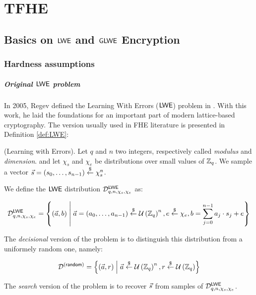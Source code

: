 
\chapter{TFHE}



\section{Basics on $\textsf{LWE}$ and $\textsf{GLWE}$ Encryption}


\subsection{Hardness assumptions}


\paragraph{Original $\textsf{LWE}$ problem}

In 2005, Regev defined the Learning With Errors ($\textsf{LWE}$) problem in \cite{regev_lwe}. With this work, he laid the foundations for an important part of modern lattice-based cryptography. The version usually used in FHE literature is presented in Definition \ref{def:LWE}:


\begin{definition}
	(Learning with Errors). Let $q$ and $n$ two integers, respectively called \textit{modulus} and \textit{dimension}.  and let $\chi_s$ and $\chi_e$ be distributions over small values of $\mathbb{Z}_q$. We sample a vector $\vec s = (s_0, \dots, s_{n-1}) \overset{\$}{\leftarrow} \chi_s^n$. 
	
	We define the $\textsf{LWE}$ distribution $\mathcal{D}_{q, n, \chi_s, \chi_e}^{\textsf{LWE}}$ as:
	
	 \[
	 \mathcal{D}_{q, n, \chi_s, \chi_e}^{\textsf{LWE}} = \left \{(\vec a, b) \;\middle|\; \vec a = (a_0, \dots, a_{n-1}) \overset{\$}{\leftarrow} \mathcal U \left ( \mathbb{Z}_q \right )^n, e \overset{\$}{\leftarrow} \chi_e, b = \sum_{j=0}^{n-1} a_j \cdot s_j + e \right \}
	  \]
	 
	 The \textit{decisional} version of the problem is to distinguish this distribution from a uniformely random one, namely:
	
	\[
	\mathcal{D}^{(\textsf{random})} = \left \{(\vec a, r) \;\middle|\; \vec a \overset{\$}{\leftarrow} \mathcal U \left ( \mathbb{Z}_q \right )^n, r \overset{\$}{\leftarrow} \mathcal U \left ( \mathbb{Z}_q \right ) \right\}
	\]

	The \emph{search} version of the problem is to recover $\vec s$ from samples of $\mathcal{D}_{q, n, \chi_s, \chi_e}^{\textsf{LWE}}$. 
	\label{def:LWE}
\end{definition}


